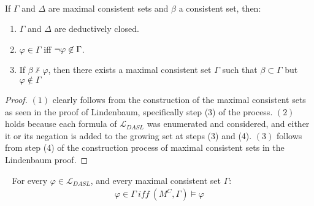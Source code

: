 \begin{lemma}[Properties]~\label{properties}

If $\Gamma$ and $\Delta$ are maximal consistent sets and $\beta$ a consistent set, then:
\begin{enumerate}
	\item $\Gamma$ and $\Delta$ are deductively closed.
	\item $\varphi \in \Gamma$ iff ${\neg} \varphi \not\in \Gamma$.
    \item If $\beta \not \vdash \varphi$, then there exists a maximal consistent set $\Gamma$ such that $\beta \subset \Gamma$ but $\varphi \not \in \Gamma$
\end{enumerate}
\end{lemma}
\begin{proof}
	$(1)$ clearly follows from the construction of the maximal consistent sets as seen in the proof of Lindenbaum, specifically step (3) of the process. $(2)$ holds because each formula of $\mathcal{L}_{DASL}$ was enumerated and considered, and either it or its negation is added to the growing set at steps (3) and (4). $(3)$ follows from step (4) of the construction process of maximal consistent sets in the Lindenbaum proof.  
\end{proof}
\begin{lemma}[Truth]~\label{truth}
For every $\varphi \in \mathcal{L}_{DASL}$, and every maximal consistent set $\Gamma$:
\begin{eqnarray}
	\varphi \in \Gamma \ \mathit{iff}\ (M^C,\Gamma)\models\varphi
\end{eqnarray}
\end{lemma}
